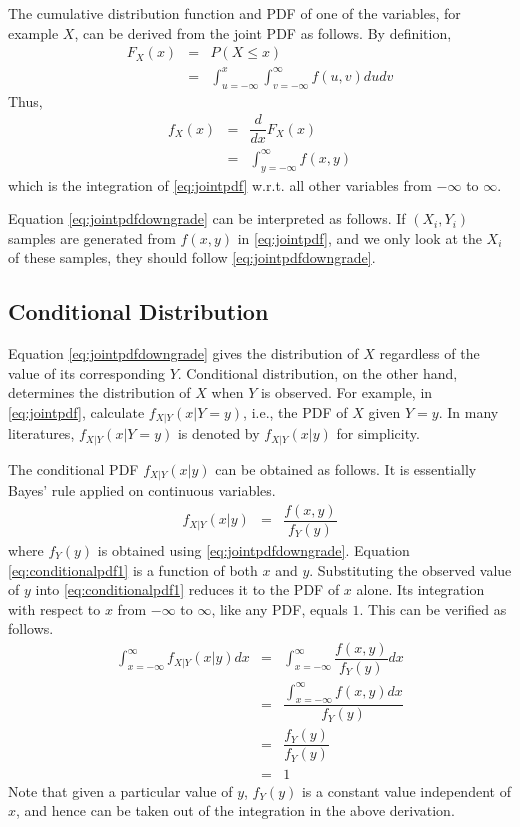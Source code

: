 The cumulative distribution function and PDF of one of the variables, for example $X$, can be derived from the joint PDF as follows. By definition, 
\begin{eqnarray}
	F_X(x) &=& P(X \leq x) \nonumber \\
	&=& \int_{u=-\infty}^{x}\int_{v=-\infty}^{\infty}f(u, v)dudv \nonumber
\end{eqnarray}
Thus,
\begin{eqnarray}
	f_X(x) &=& \dfrac{d}{dx}F_X(x) \nonumber \\
	&=& \int_{y=-\infty}^{\infty} f(x, y) \label{eq:jointpdfdowngrade}
\end{eqnarray}
which is the integration of \eqref{eq:jointpdf} w.r.t. all other variables from $-\infty$ to $\infty$. 

Equation \eqref{eq:jointpdfdowngrade} can be interpreted as follows. If $(X_i, Y_i)$ samples are generated from $f(x, y)$ in \eqref{eq:jointpdf}, and we only look at the $X_i$ of these samples, they should follow \eqref{eq:jointpdfdowngrade}.

\subsection{Conditional Distribution}

Equation \eqref{eq:jointpdfdowngrade} gives the distribution of $X$ regardless of the value of its corresponding $Y$. Conditional distribution, on the other hand, determines the distribution of $X$ when $Y$ is observed. For example, in \eqref{eq:jointpdf}, calculate $f_{X|Y}(x |Y=y)$, i.e., the PDF of $X$ given $Y=y$. In many literatures, $f_{X|Y}(x |Y=y)$ is denoted by $f_{X|Y}(x|y)$ for simplicity.

The conditional PDF $f_{X|Y}(x|y)$ can be obtained as follows. It is essentially Bayes' rule applied on continuous variables.
\begin{eqnarray}
  f_{X|Y}(x|y) &=& \dfrac{f(x, y)}{f_Y(y)} \label{eq:conditionalpdf1}
\end{eqnarray}
where $f_Y(y)$ is obtained using \eqref{eq:jointpdfdowngrade}. Equation \eqref{eq:conditionalpdf1} is a function of both $x$ and $y$. Substituting the observed value of $y$ into \eqref{eq:conditionalpdf1} reduces it to the PDF of $x$ alone. Its integration with respect to $x$ from $-\infty$ to $\infty$, like any PDF, equals $1$. This can be verified as follows.
\begin{eqnarray}
  \int_{x=-\infty}^{\infty}f_{X|Y}(x|y)dx &=& \int_{x=-\infty}^{\infty}\dfrac{f(x, y)}{f_Y(y)}dx \nonumber \\
  &=& \dfrac{\int_{x=-\infty}^{\infty}f(x, y)dx}{f_Y(y)} \nonumber \\
  &=& \dfrac{f_Y(y)}{f_Y(y)} \nonumber \\
  &=& 1 \nonumber
\end{eqnarray}
Note that given a particular value of $y$, $f_Y(y)$ is a constant value independent of $x$, and hence can be taken out of the integration in the above derivation.

